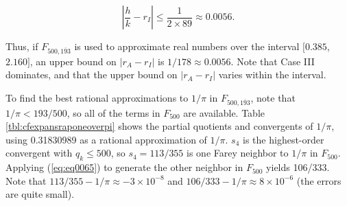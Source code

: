 \documentclass{esub2acm}
\begin{document}
\begin{equation}
\left| {\frac{h}{k} - r_I} \right|
\leq
\frac{1}{2 \times 89} \approx 0.0056 .
\end{equation}

Thus, if $F_{500, \overline{193}}$ is used to approximate real numbers over the
interval $[0.385$, $2.160]$, an upper bound on $|r_A - r_I|$ is $1/178 \approx 0.0056$.
Note that Case III dominates, and that the upper bound on $|r_A - r_I|$ varies
within the interval.

To find the best rational approximations to $1/ \pi$ in $F_{500, \overline{193}}$,
note that $1/ \pi < 193/500$, so all of the terms in $F_{500}$ are available.
Table \ref{tbl:cfexpansraponeoverpi} shows the partial quotients and convergents
of $1/ \pi$, using 0.31830989 as a rational approximation of $1/ \pi$.  $s_4$
is the highest-order convergent with $q_k \leq 500$, so $s_4 = 113/355$ is one
Farey neighbor to $1/ \pi$ in $F_{500}$.  Applying (\ref{eq:eq0065}) to generate
the other neighbor in $F_{500}$ yields 106/333.  Note that $113/355 - 1/\pi \approx -3 \times 10^{-8}$
and $106/333 - 1/\pi \approx 8 \times 10^{-6}$ (the errors are quite small).
\end{document}
